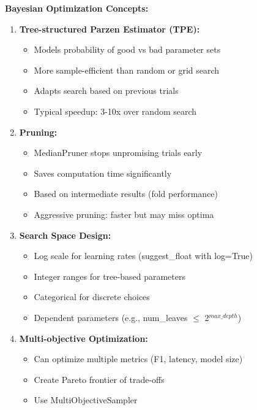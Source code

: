 \textbf{Bayesian Optimization Concepts:}

\begin{enumerate}
    \item \textbf{Tree-structured Parzen Estimator (TPE):}
    \begin{itemize}
        \item Models probability of good vs bad parameter sets
        \item More sample-efficient than random or grid search
        \item Adapts search based on previous trials
        \item Typical speedup: 3-10x over random search
    \end{itemize}

    \item \textbf{Pruning:}
    \begin{itemize}
        \item MedianPruner stops unpromising trials early
        \item Saves computation time significantly
        \item Based on intermediate results (fold performance)
        \item Aggressive pruning: faster but may miss optima
    \end{itemize}

    \item \textbf{Search Space Design:}
    \begin{itemize}
        \item Log scale for learning rates (suggest\_float with log=True)
        \item Integer ranges for tree-based parameters
        \item Categorical for discrete choices
        \item Dependent parameters (e.g., num\_leaves $\leq$ 2$^{max\_depth}$)
    \end{itemize}

    \item \textbf{Multi-objective Optimization:}
    \begin{itemize}
        \item Can optimize multiple metrics (F1, latency, model size)
        \item Create Pareto frontier of trade-offs
        \item Use MultiObjectiveSampler
    \end{itemize}
\end{enumerate}

